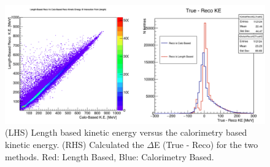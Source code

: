 \begin{figure}[htb]
\centering
\includegraphics[scale=0.38]{./images/CaloMethodsCompared.png}
\caption{(LHS) Length based kinetic energy versus the calorimetry based kinetic energy. (RHS) Calculated the $\Delta$E (True - Reco) for the two methods. Red: Length Based, Blue: Calorimetry Based. }
\label{fig:CaloMethvsLengthMeth}
\end{figure}



\newpage